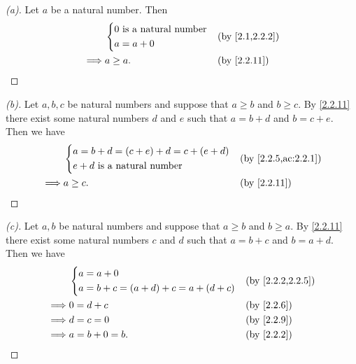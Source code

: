 \begin{proof}[(a)]
  Let \(a\) be a natural number.
  Then
  \begin{align*}
             & \begin{dcases}
                 0 \text{ is a natural number} \\
                 a = a + 0
               \end{dcases} &  & \by{2.1,2.2.2}                  \\
    \implies & a \geq a.                        &  & \by{2.2.11}
  \end{align*}
\end{proof}

\begin{proof}[(b)]
  Let \(a, b, c\) be natural numbers and suppose that \(a \geq b\) and \(b \geq c\).
  By \cref{2.2.11} there exist some natural numbers \(d\) and \(e\) such that \(a = b + d\) and \(b = c + e\).
  Then we have
  \begin{align*}
             & \begin{dcases}
                 a = b + d = (c + e) + d = c + (e + d) \\
                 e + d \text{ is a natural number}
               \end{dcases} &  & \by{2.2.5,ac:2.2.1}                     \\
    \implies & a \geq c.                                &  & \by{2.2.11}
  \end{align*}
\end{proof}

\begin{proof}[(c)]
  Let \(a, b\) be natural numbers and suppose that \(a \geq b\) and \(b \geq a\).
  By \cref{2.2.11} there exist some natural numbers \(c\) and \(d\) such that \(a = b + c\) and \(b = a + d\).
  Then we have
  \begin{align*}
             & \begin{dcases}
                 a = a + 0 \\
                 a = b + c = (a + d) + c = a + (d + c)
               \end{dcases} &  & \by{2.2.2,2.2.5}                  \\
    \implies & 0 = d + c                             &  & \by{2.2.6} \\
    \implies & d = c = 0                             &  & \by{2.2.9} \\
    \implies & a = b + 0 = b.                        &  & \by{2.2.2}
  \end{align*}
\end{proof}

